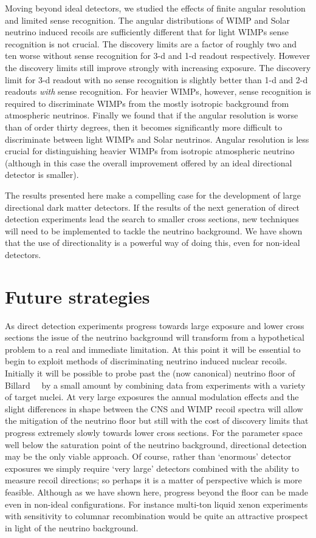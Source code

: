 Moving beyond ideal detectors, we studied the effects of finite angular resolution and limited sense recognition.
The angular distributions of WIMP and Solar neutrino induced recoils are sufficiently different that for light WIMPs sense recognition is not crucial. The discovery limits are a factor of roughly two and ten worse without sense recognition for 3-d and 1-d readout respectively. However the discovery limits still improve strongly with increasing exposure. The discovery limit for 3-d readout with no sense recognition is slightly better than 1-d and 2-d readouts {\it with} sense recognition. For heavier WIMPs, however, sense recognition is required to discriminate WIMPs from the mostly isotropic background from atmospheric neutrinos.
Finally we found that if the angular resolution is worse than of order thirty degrees, then it becomes significantly more difficult to discriminate between light WIMPs and Solar neutrinos.  Angular resolution is less crucial for distinguishing heavier WIMPs from isotropic atmospheric neutrino (although in this case the overall improvement offered by an ideal directional detector is smaller).

The results presented here make a compelling case for the development of large directional dark matter detectors.
If the results of the next generation of direct detection experiments lead the search to smaller cross sections, new techniques will need to be implemented to tackle the neutrino background. We have shown that the use of directionality is a powerful way of doing this, even for non-ideal detectors.

\section{Future strategies}
\label{sec:nufloor_conc} 
As direct detection experiments progress towards large exposure and lower cross sections the issue of the neutrino background will transform from a hypothetical problem to a real and immediate limitation. At this point it will be essential to begin to exploit methods of discriminating neutrino induced nuclear recoils. Initially it will be possible to probe past the (now canonical) neutrino floor of Billard~\etal~\cite{Billard:2013qya} by a small amount by combining data from experiments with a variety of target nuclei. At very large exposures the annual modulation effects and the slight differences in shape between the CNS and WIMP recoil spectra will allow the mitigation of the neutrino floor but still with the cost of discovery limits that progress extremely slowly towards lower cross sections. For the parameter space well below the saturation point of the neutrino background, directional detection may be the only viable approach. Of course, rather than `enormous' detector exposures we simply require `very large' detectors combined with the ability to measure recoil directions; so perhaps it is a matter of perspective which is more feasible. Although as we have shown here, progress beyond the floor can be made even in non-ideal configurations. For instance multi-ton liquid xenon experiments with sensitivity to columnar recombination would be quite an attractive prospect in light of the neutrino background.

